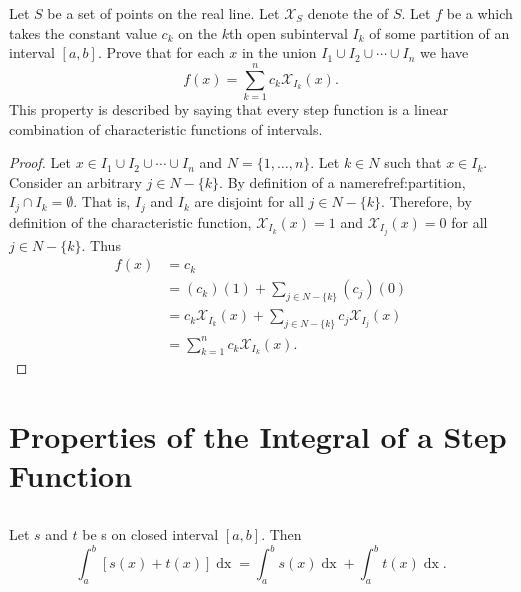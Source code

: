 \documentclass{report}
\begin{document}
  Let $S$ be a set of points on the real line.
  Let $\mathcal{X}_S$ denote the  of $S$.
  Let $f$ be a  which takes the constant value
    $c_k$ on the $k$th open subinterval $I_k$ of some partition of an interval
    $[a, b]$.
  Prove that for each $x$ in the union $I_1 \cup I_2 \cup \cdots \cup I_n$ we
    have $$f(x) = \sum_{k=1}^n c_k\mathcal{X}_{I_k}(x).$$
  This property is described by saying that every step function is a linear
    combination of characteristic functions of intervals.

  \begin{proof}
    Let $x \in I_1 \cup I_2 \cup \cdots \cup I_n$ and $N = \{1, \ldots, n\}$.
    Let $k \in N$ such that $x \in I_k$.
    Consider an arbitrary $j \in N - \{k\}$.
    By definition of a nameref{ref:partition}, $I_j \cap I_k = \emptyset$.
    That is, $I_j$ and $I_k$ are disjoint for all $j \in N - \{k\}$.
    Therefore, by definition of the characteristic function,
      $\mathcal{X}_{I_k}(x) = 1$ and $\mathcal{X}_{I_j}(x) = 0$ for all
      $j \in N - \{k\}$.
    Thus
      \begin{align*}
        f(x)
          & = c_k \\
          & = (c_k)(1) + \sum\nolimits_{j \in N - \{k\}} (c_j)(0) \\
          & = c_k\mathcal{X}_{I_k}(x) +
            \sum\nolimits_{j \in N - \{k\}} c_j\mathcal{X}_{I_j}(x) \\
          & = \sum_{k=1}^n c_k\mathcal{X}_{I_k}(x).
      \end{align*}
  \end{proof}

\section{Properties of the Integral of a Step Function}%

\subsection{}%

  \begin{theorem}[1.2]
    Let $s$ and $t$ be s on closed interval
      $[a, b]$.
    Then
      $$\int_a^b \left[ s(x) + t(x) \right] \mathop{dx} =
        \int_a^b s(x) \mathop{dx} + \int_a^b t(x) \mathop{dx}.$$
  \end{theorem}
\end{document}
